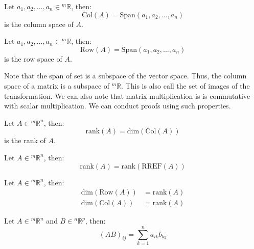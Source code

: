 \documentclass[11pt]{article}
\begin{document}
\begin{definition}
    Let $a_1, a_2, \ldots, {a_n} \in {^m\mathbb{R}}$, then:   
    \begin{equation}
        \text{Col}(A) = \text{Span}({a_1}, {a_2}, \ldots, {a_n})
    \end{equation}
    is the column space of $A$.
\end{definition}
\begin{definition}
    Let $a_1, a_2, \ldots, {a_n} \in {^m\mathbb{R}}$, then:   
    \begin{equation}
        \text{Row}(A) = \text{Span}({a_1}, {a_2}, \ldots, {a_n})
    \end{equation}
    is the row space of $A$.
\end{definition}
Note that the span of set is a subspace of the vector space. Thus, the column space of a matrix is a subspace of $^m\mathbb{R}$. This is also call the set of images of the transformation. We can also note that matrix multiplication is is commutative with scalar multiplication. We can conduct proofs using such properties.
\begin{definition}[Rank]
    Let $A \in {^m\mathbb{R}^n}$, then:
    \begin{equation}
        \text{rank}(A) = \text{dim}(\text{Col}(A))
    \end{equation}
    is the rank of $A$.
\end{definition}
\begin{theorem}
    Let $A \in {^m\mathbb{R}^n}$, then:
    \begin{equation}
        \text{rank}(A) = \text{rank}(\text{RREF}(A))
    \end{equation}
\end{theorem}
\begin{theorem}
    Let $A \in {^m\mathbb{R}^n}$, then:
    \begin{align}
        \text{dim}(\text{Row}(A)) &= \text{rank}(A) \\
        \text{dim}(\text{Col}(A)) &= \text{rank}(A)
    \end{align}
\end{theorem}
\begin{definition}
    Let $A \in {^m\mathbb{R}^n}$ and $B \in {^n\mathbb{R}^p}$, then:
    \begin{equation}
        (AB)_{ij} = \sum_{k=1}^{n} a_{ik}b_{kj}
    \end{equation}
\end{definition}
\end{document}
